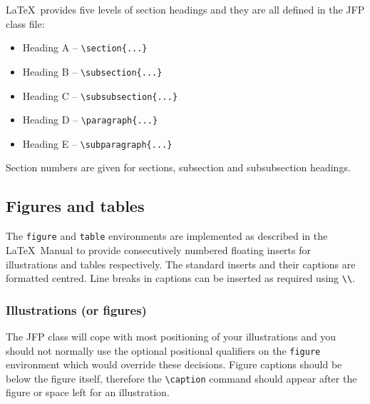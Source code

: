 \documentclass{jfp}
\begin{document}
\LaTeX\ provides five levels of section headings and they are all
defined in the JFP class file:
\begin{itemize}
  \item[] Heading A -- \verb"\section{...}"
  \item[] Heading B -- \verb"\subsection{...}"
  \item[] Heading C -- \verb"\subsubsection{...}"
  \item[] Heading D -- \verb"\paragraph{...}"
  \item[] Heading E -- \verb"\subparagraph{...}"
\end{itemize}
Section numbers are given for sections, subsection and subsubsection headings.

\subsection{Figures and tables}

The \texttt{figure} and \texttt{table} environments are implemented as described in
the \LaTeX\ Manual to
provide consecutively numbered floating inserts for illustrations and tables
respectively.
The standard inserts and their captions are formatted centred.
Line breaks in captions can be inserted as required using \verb"\\".

\subsubsection{Illustrations (or figures)}

The JFP class will cope with most positioning of your illustrations
and you should not normally use the optional positional qualifiers on
the \verb"figure" environment which would override these decisions.
Figure captions should be below the figure itself, therefore the
\verb"\caption" command should appear after the figure or space left
for an illustration.
\end{document}
